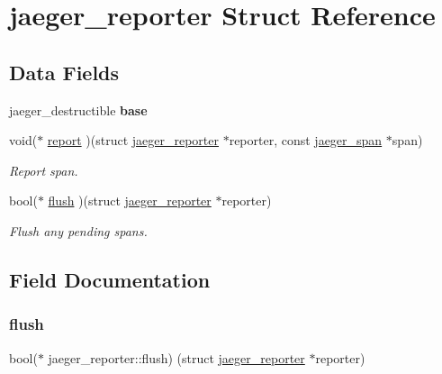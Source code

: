 \hypertarget{structjaeger__reporter}{}\section{jaeger\+\_\+reporter Struct Reference}
\label{structjaeger__reporter}
\subsection*{Data Fields}
\begin{DoxyCompactItemize}
\item 
\mbox{\label{structjaeger__reporter_af897c2ec6ff7a5340f14008ffad9a209}} 
jaeger\+\_\+destructible {\bfseries base}
\item 
void($\ast$ \mbox{\hyperlink{structjaeger__reporter_a39f5460f19fe10f0267a6e6be240c1cc}{report}} )(struct \mbox{\hyperlink{structjaeger__reporter}{jaeger\+\_\+reporter}} $\ast$reporter, const \mbox{\hyperlink{structjaeger__span}{jaeger\+\_\+span}} $\ast$span)
\begin{DoxyCompactList}\small\item\em Report span. \end{DoxyCompactList}\item 
bool($\ast$ \mbox{\hyperlink{structjaeger__reporter_a8cfdee6e96497116c184476050b8fb13}{flush}} )(struct \mbox{\hyperlink{structjaeger__reporter}{jaeger\+\_\+reporter}} $\ast$reporter)
\begin{DoxyCompactList}\small\item\em Flush any pending spans. \end{DoxyCompactList}\end{DoxyCompactItemize}


\subsection{Field Documentation}
\mbox{\label{structjaeger__reporter_a8cfdee6e96497116c184476050b8fb13}} 
\subsubsection{\texorpdfstring{flush}{flush}}
{\footnotesize\ttfamily bool($\ast$ jaeger\+\_\+reporter\+::flush) (struct \mbox{\hyperlink{structjaeger__reporter}{jaeger\+\_\+reporter}} $\ast$reporter)}



